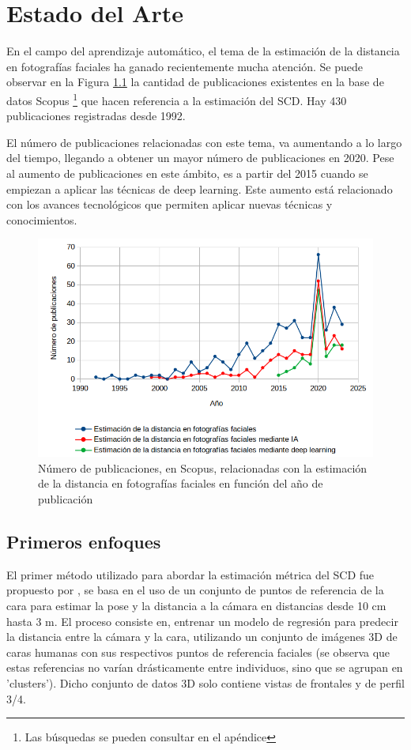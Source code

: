 \chapter{Estado del Arte}
\thispagestyle{empty}

En el campo del aprendizaje automático, el tema de la estimación de la distancia en fotografías faciales ha ganado recientemente mucha atención. Se puede observar en la Figura \ref{fig5} la cantidad de publicaciones existentes en la base de datos Scopus \footnote{Las búsquedas se pueden consultar en el apéndice} que hacen referencia a la estimación del SCD. Hay 430 publicaciones registradas desde 1992.

El número de publicaciones relacionadas con este tema, va aumentando a lo largo del tiempo, llegando a obtener un mayor número de publicaciones en 2020. Pese al aumento de publicaciones en este ámbito, es a partir del 2015 cuando se empiezan a aplicar las técnicas de deep learning. Este aumento está relacionado con los avances tecnológicos que permiten aplicar nuevas técnicas y conocimientos. 

\begin{figure}[h]
	\centering
	\includegraphics[scale=0.45]{imagenes/cap3/grafica_scopus3.png}
	\caption{Número de publicaciones, en Scopus, relacionadas con la estimación de la distancia en fotografías faciales en función del año de publicación}
	\label{fig5}
\end{figure}

\section{Primeros enfoques}

El primer método utilizado para abordar la estimación métrica del SCD fue propuesto por \cite{28}, se basa en el uso de un conjunto de puntos de referencia de la cara para estimar la pose y la distancia a la cámara en distancias desde 10 cm hasta 3 m. El proceso consiste en, entrenar un modelo de regresión para predecir la distancia entre la cámara y la cara, utilizando un conjunto de imágenes 3D de caras humanas con sus respectivos puntos de referencia faciales (se observa que estas referencias no varían drásticamente entre individuos, sino que se agrupan en 'clusters'). Dicho conjunto de datos 3D solo contiene vistas de frontales y de perfil 3/4. 

